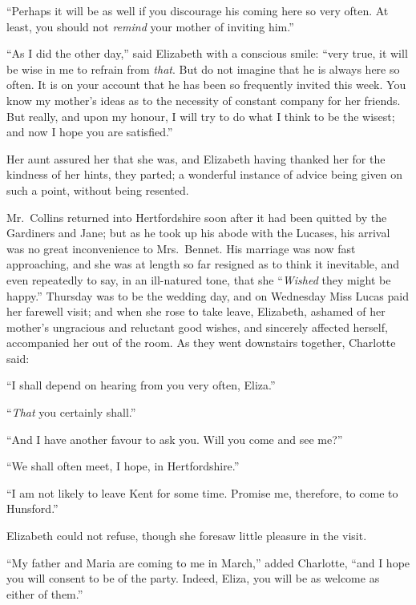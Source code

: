 \documentclass[12pt,english,oneside]{book}
\begin{document}
{}``Perhaps it will be as well if you discourage his coming here
so very often. At least, you should not \textit{remind} your mother
of inviting him.''

{}``As I did the other day,'' said Elizabeth with a conscious smile:
{}``very true, it will be wise in me to refrain from \textit{that}.
But do not imagine that he is always here so often. It is on your
account that he has been so frequently invited this week. You know
my mother's ideas as to the necessity of constant company for her
friends. But really, and upon my honour, I will try to do what I think
to be the wisest; and now I hope you are satisfied.''

Her aunt assured her that she was, and Elizabeth having thanked her
for the kindness of her hints, they parted; a wonderful instance of
advice being given on such a point, without being resented.

Mr.\ Collins returned into Hertfordshire soon after it had been quitted
by the Gardiners and Jane; but as he took up his abode with the Lucases,
his arrival was no great inconvenience to Mrs.\ Bennet. His marriage
was now fast approaching, and she was at length so far resigned as
to think it inevitable, and even repeatedly to say, in an ill-natured
tone, that she {}``\textit{Wished} they might be happy.'' Thursday
was to be the wedding day, and on Wednesday Miss Lucas paid her farewell
visit; and when she rose to take leave, Elizabeth, ashamed of her
mother's ungracious and reluctant good wishes, and sincerely affected
herself, accompanied her out of the room. As they went downstairs
together, Charlotte said:

{}``I shall depend on hearing from you very often, Eliza.''

{}``\textit{That} you certainly shall.''

{}``And I have another favour to ask you. Will you come and see me?''\ 

{}``We shall often meet, I hope, in Hertfordshire.''

{}``I am not likely to leave Kent for some time. Promise me, therefore,
to come to Hunsford.''

Elizabeth could not refuse, though she foresaw little pleasure in
the visit.

{}``My father and Maria are coming to me in March,'' added Charlotte,
{}``and I hope you will consent to be of the party. Indeed, Eliza,
you will be as welcome as either of them.''
\end{document}
